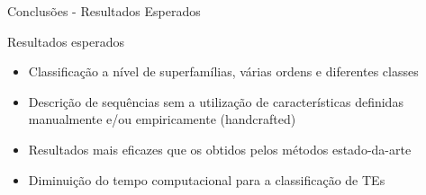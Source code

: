 \documentclass[%
  xcolor=table,%
  10pt,%
  aspectratio = 169,%
  compress,%
  t,%
]{beamer}%
\begin{document}
\begin{frame}{}{Conclusões - Resultados Esperados}
    \begin{block}{Resultados esperados}
        \begin{itemize}
            \item Classificação a nível de superfamílias, várias ordens e diferentes classes
            \item Descrição de sequências sem a utilização de características definidas manualmente e/ou empiricamente (handcrafted)
            \item Resultados mais eficazes que os obtidos pelos métodos estado-da-arte
            \item Diminuição do tempo computacional para a classificação de TEs
        \end{itemize}
    \end{block}
\end{frame}
\end{document}
